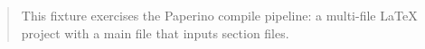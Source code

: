 \begin{abstract}
This fixture exercises the Paperino compile pipeline: a multi-file LaTeX
project with a main file that inputs section files.
\end{abstract}
